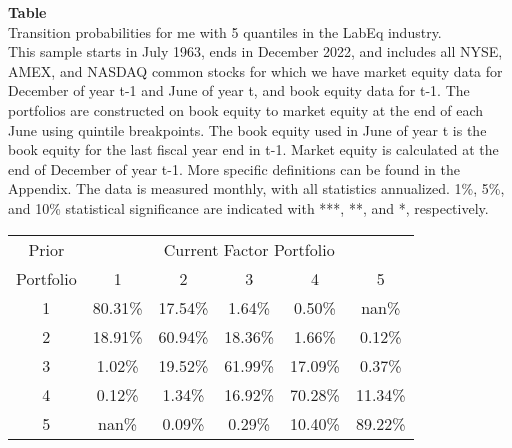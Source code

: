 \begin{table*}[ht!]
\raggedright
{}
\label{tab: transition_probs_me_LabEq_with_5_quantiles}
\textbf{Table \thetable} \\
Transition probabilities for me with 5 quantiles in the LabEq industry. \\
\hspace*{1em}This sample starts in July 1963, ends in December 2022, and includes all NYSE, AMEX, and NASDAQ common stocks for which we have market equity data for December of year t-1 and June of year t, and book equity data for t-1. The portfolios are constructed on book equity to market equity at the end of each June using quintile breakpoints.  The book equity used in June of year t is the book equity for the last fiscal year end in t-1.  Market equity is calculated at the end of December of year t-1.  More specific definitions can be found in the Appendix.  The data is measured monthly, with all statistics annualized.  1\%, 5\%, and 10\% statistical significance are indicated with ***, **, and *, respectively. \\
\vspace{0.5em}
\centering
\begin{adjustbox}{max width=\textwidth}
\begin{tabular}{@{}cccccc@{}}
\toprule
Prior & \multicolumn{5}{c}{Current Factor Portfolio} \\
Portfolio & 1 & 2 & 3 & 4 & 5 \\
\midrule
1 & 80.31\% & 17.54\% & 1.64\% & 0.50\% & nan\% \\
2 & 18.91\% & 60.94\% & 18.36\% & 1.66\% & 0.12\% \\
3 & 1.02\% & 19.52\% & 61.99\% & 17.09\% & 0.37\% \\
4 & 0.12\% & 1.34\% & 16.92\% & 70.28\% & 11.34\% \\
5 & nan\% & 0.09\% & 0.29\% & 10.40\% & 89.22\% \\
\bottomrule
\end{tabular}
\end{adjustbox}
\end{table*}